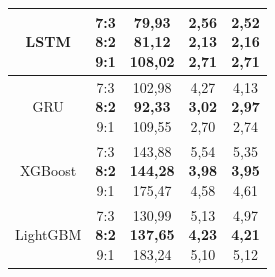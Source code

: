 \documentclass{ieeeojies}
\begin{document}
\begin{table}[H]
\begin{tabular*}{\linewidth}{@{\extracolsep{\fill}}|c|c|c|c|c|}
        \hline
        LSTM & \makecell{7:3 \\ \textbf{8:2} \\ 9:1} & \makecell{79,93 \\ \textbf{81,12} \\ 108,02} & \makecell{2,56 \\ \textbf{2,13} \\ 2,71} & \makecell{2,52 \\ \textbf{2,16} \\ 2,71} \\
        \hline
        GRU & \makecell{7:3 \\ \textbf{8:2} \\ 9:1} & \makecell{102,98 \\ \textbf{92,33} \\ 109,55} & \makecell{4,27 \\ \textbf{3,02} \\ 2,70} & \makecell{4,13 \\ \textbf{2,97} \\ 2,74} \\
        \hline
        XGBoost & \makecell{7:3 \\ \textbf{8:2} \\ 9:1} & \makecell{143,88 \\ \textbf{144,28} \\ 175,47} & \makecell{5,54 \\ \textbf{3,98} \\ 4,58} & \makecell{5,35 \\ \textbf{3,95} \\ 4,61} \\
        \hline
        LightGBM & \makecell{7:3 \\ \textbf{8:2} \\ 9:1} & \makecell{130,99 \\ \textbf{137,65} \\ 183,24} & \makecell{5,13 \\ \textbf{4,23} \\ 5,10} & \makecell{4,97 \\ \textbf{4,21} \\ 5,12} \\
        \hline
    \end{tabular*}
    

\end{table}
\end{document}
